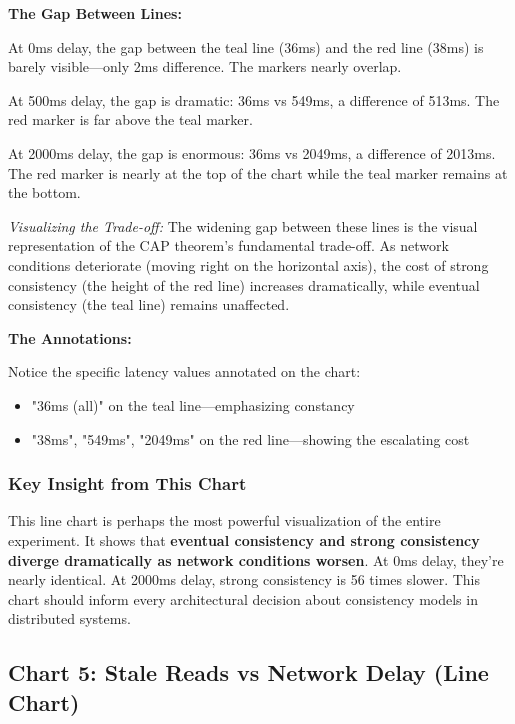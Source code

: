 \documentclass[10pt,a4paper]{article}
\begin{document}
\textbf{The Gap Between Lines:}

At 0ms delay, the gap between the teal line (36ms) and the red line (38ms) is barely visible---only 2ms difference. The markers nearly overlap.

At 500ms delay, the gap is dramatic: 36ms vs 549ms, a difference of 513ms. The red marker is far above the teal marker.

At 2000ms delay, the gap is enormous: 36ms vs 2049ms, a difference of 2013ms. The red marker is nearly at the top of the chart while the teal marker remains at the bottom.

\textit{Visualizing the Trade-off:} The widening gap between these lines is the visual representation of the CAP theorem's fundamental trade-off. As network conditions deteriorate (moving right on the horizontal axis), the cost of strong consistency (the height of the red line) increases dramatically, while eventual consistency (the teal line) remains unaffected.

\textbf{The Annotations:}

Notice the specific latency values annotated on the chart:
\begin{itemize}
    \item "36ms (all)" on the teal line---emphasizing constancy
    \item "38ms", "549ms", "2049ms" on the red line---showing the escalating cost
\end{itemize}

\subsubsection{Key Insight from This Chart}

This line chart is perhaps the most powerful visualization of the entire experiment. It shows that \textbf{eventual consistency and strong consistency diverge dramatically as network conditions worsen}. At 0ms delay, they're nearly identical. At 2000ms delay, strong consistency is 56 times slower. This chart should inform every architectural decision about consistency models in distributed systems.

\newpage

\subsection{Chart 5: Stale Reads vs Network Delay (Line Chart)}
\end{document}
